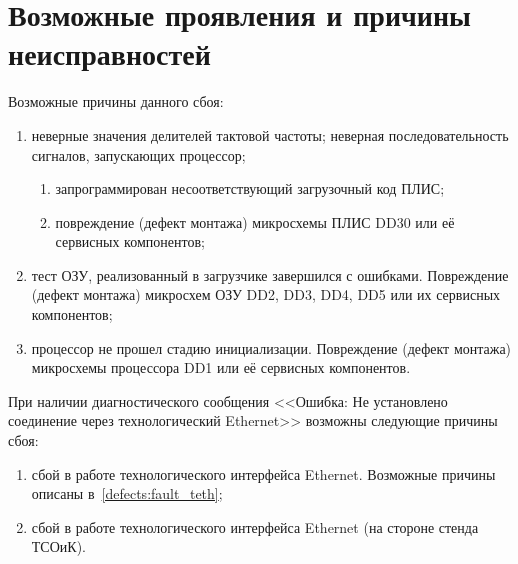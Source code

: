\section{Возможные проявления и причины неисправностей}
\label {failure_simptoms_reasons}
    \label{defects:fault_uboot}
    \subpoint Возможные причины данного сбоя:
      \begin{enumerate}	
	\item неверные значения делителей тактовой частоты; неверная последовательность сигналов, запускающих процессор;
	  \begin{enumerate}
	    \item запрограммирован несоответствующий загрузочный код ПЛИС;
	    \item повреждение (дефект монтажа) микросхемы ПЛИС DD30 или её сервисных компонентов;
	  \end{enumerate}
	\item тест ОЗУ, реализованный в загрузчике завершился с ошибками. Повреждение (дефект монтажа) микросхем ОЗУ DD2, DD3, DD4, DD5 или их сервисных компонентов;
	\item процессор не прошел стадию инициализации. Повреждение (дефект монтажа) микросхемы процессора DD1 или её сервисных компонентов.
      \end{enumerate}
    
    \subpoint При наличии диагностического сообщения <<Ошибка: Не установлено соединение через технологический Ether\-net>> возможны следующие причины сбоя:
      \begin{enumerate}  
	\item сбой в работе технологического интерфейса Ethernet. Возможные причины описаны в~\ref{defects:fault_teth};
	\item сбой в работе технологического интерфейса Ethernet (на стороне стенда ТСОиК).
      \end{enumerate}
      
